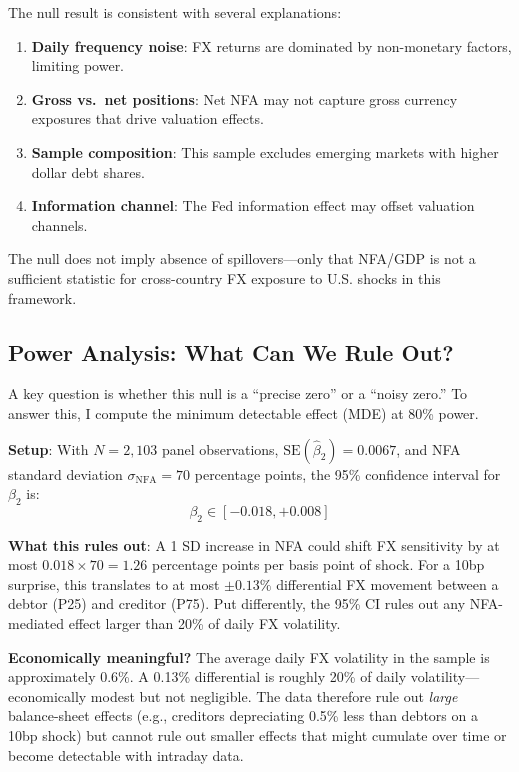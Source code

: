 \documentclass[12pt]{article}
\begin{document}
The null result is consistent with several explanations:
\begin{enumerate}
    \item \textbf{Daily frequency noise}: FX returns are dominated by non-monetary factors, limiting power.
    \item \textbf{Gross vs.\ net positions}: Net NFA may not capture gross currency exposures that drive valuation effects.
    \item \textbf{Sample composition}: This sample excludes emerging markets with higher dollar debt shares.
    \item \textbf{Information channel}: The Fed information effect may offset valuation channels.
\end{enumerate}

The null does not imply absence of spillovers---only that NFA/GDP is not a sufficient statistic for cross-country FX exposure to U.S. shocks in this framework.

\subsection{Power Analysis: What Can We Rule Out?}

A key question is whether this null is a ``precise zero'' or a ``noisy zero.'' To answer this, I compute the minimum detectable effect (MDE) at 80\% power.

\textbf{Setup}: With $N = 2,103$ panel observations, $\text{SE}(\hat{\beta}_2) = 0.0067$, and NFA standard deviation $\sigma_{\text{NFA}} = 70$ percentage points, the 95\% confidence interval for $\beta_2$ is:
\begin{equation}
\beta_2 \in [-0.018, +0.008]
\end{equation}

\textbf{What this rules out}: A 1 SD increase in NFA could shift FX sensitivity by at most $0.018 \times 70 = 1.26$ percentage points per basis point of shock. For a 10bp surprise, this translates to at most $\pm 0.13\%$ differential FX movement between a debtor (P25) and creditor (P75). Put differently, the 95\% CI rules out any NFA-mediated effect larger than 20\% of daily FX volatility.

\textbf{Economically meaningful?} The average daily FX volatility in the sample is approximately 0.6\%. A 0.13\% differential is roughly 20\% of daily volatility---economically modest but not negligible. The data therefore rule out \textit{large} balance-sheet effects (e.g., creditors depreciating 0.5\% less than debtors on a 10bp shock) but cannot rule out smaller effects that might cumulate over time or become detectable with intraday data.
\end{document}
